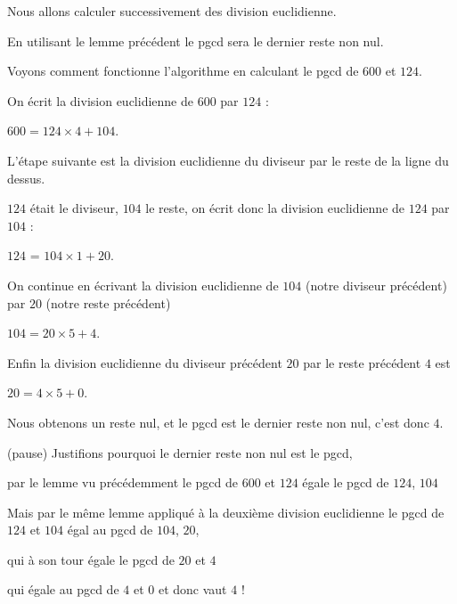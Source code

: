 \change

Nous allons calculer successivement des division euclidienne.

\change

En utilisant le lemme précédent le pgcd sera le dernier 
reste non nul.


\change

Voyons comment fonctionne l'algorithme en calculant le pgcd de $600$ et $124$.

\change

On écrit la division euclidienne de $600$ par $124$ :

$600=124 \times 4 + 104$.


\change

L'étape suivante est la division euclidienne du diviseur par le reste de la ligne du dessus.



$124$ était le diviseur, $104$ le reste, on écrit donc la division euclidienne de $124$ par $104$ :

\change

$124$ = $104 \times 1 + 20$.

\change

On continue en écrivant la division euclidienne de $104$ (notre diviseur précédent)
par $20$ (notre reste précédent)

\change

$104= 20 \times 5 + 4$.

\change

Enfin la division euclidienne du diviseur précédent $20$ par le reste précédent $4$
est

$20 = 4 \times 5 + 0$.

\change

Nous obtenons un reste nul, et le pgcd est le dernier reste non nul, c'est donc $4$.

\change

(pause)
Justifions pourquoi le dernier reste non nul est le pgcd,

par le lemme vu précédemment
le pgcd de $600$ et $124$ égale le pgcd de $124$, $104$

Mais par le même lemme appliqué à la deuxième division euclidienne le pgcd de $124$ et $104$ 
égal au pgcd de $104$, $20$,

qui à son tour égale le pgcd de $20$ et $4$

qui égale au pgcd de $4$ et $0$ et donc vaut $4$ !


\diapo

